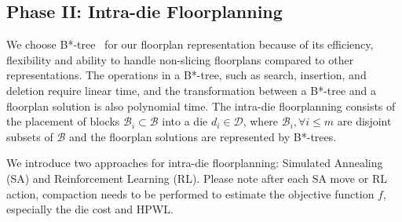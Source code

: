 \subsection{Phase II: Intra-die Floorplanning}
\label{sec:intradie_floorplan}

We choose B*-tree~\cite{chang2000btree} for our floorplan representation because of its efficiency, flexibility and ability to handle non-slicing floorplans compared to other representations. 
The operations in a B*-tree, such as search, insertion, and deletion require linear time, and the transformation between a B*-tree and a floorplan solution is also polynomial time. The intra-die floorplanning consists of the placement of blocks $\mathcal{B}_i\subset \mathcal{B}$ into a die $d_i \in \mathcal{D}$, where $\mathcal{B}_i, \forall i\le m$ are disjoint subsets of $\mathcal{B}$ and the floorplan solutions are represented by B*-trees. 


\iffalse
\begin{itemize}
  \item Bottom boundary: Right child node of the root node.
  \item Left boundary: Left child node of the root node.
  \item Top boundary: Right-most child node in the tree.
  \item Right boundary: Left-most child node in the tree.
\end{itemize}
The dummy blocks are fixed during the intra-die floorplanning, and are removed once this stage is finished.
\fi 

We introduce two approaches for intra-die floorplanning: Simulated Annealing (SA) and Reinforcement Learning (RL). Please note after each SA move or RL action, compaction needs to be performed to estimate the objective function $f$, especially the die cost and HPWL.

